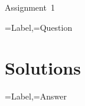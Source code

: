 \documentclass[ektypwsh]{diag-xelatex}
\begin{document}
\begin{center}
Assignment~1
\end{center}

\begin{enumerate}
\DTLforeach*{\problemDB}
 {\Label=Label,\Question=Question}%
 {%
   \item \Question
 }
\end{enumerate}

{%
 \section{Solutions}

\begin{enumerate}
\DTLforeach*{\problemDB}
 {\Label=Label,\Answer=Answer}%
 {%
   \item \Answer
 }
\end{enumerate}

}{}
\newpage
{}
\end{document}
